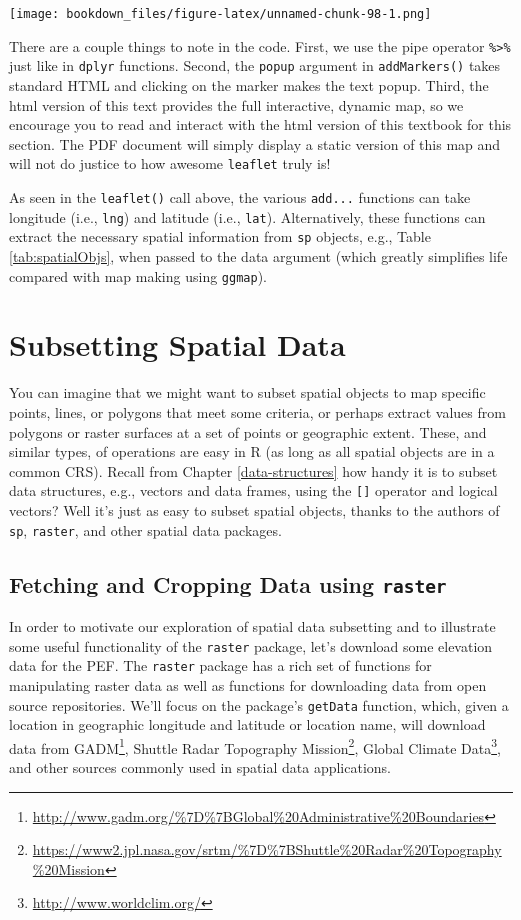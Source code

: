 \documentclass[]{krantz}
\renewcommand{\href}[2]{#2\footnote{\url{#1}}}
\theoremstyle{definition}
\theoremstyle{definition}
\theoremstyle{definition}
\theoremstyle{remark}
\begin{document}
\texttt{[image: bookdown\_files/figure-latex/unnamed-chunk-98-1.png]}

There are a couple things to note in the code. First, we use the pipe
operator \texttt{\%\textgreater{}\%} just like in \texttt{dplyr}
functions. Second, the \texttt{popup} argument in \texttt{addMarkers()}
takes standard HTML and clicking on the marker makes the text popup.
Third, the html version of this text provides the full interactive,
dynamic map, so we encourage you to read and interact with the html
version of this textbook for this section. The PDF document will simply
display a static version of this map and will not do justice to how
awesome \texttt{leaflet} truly is!

As seen in the \texttt{leaflet()} call above, the various
\texttt{add...} functions can take longitude (i.e., \texttt{lng}) and
latitude (i.e., \texttt{lat}). Alternatively, these functions can
extract the necessary spatial information from \texttt{sp} objects,
e.g., Table \ref{tab:spatialObjs}, when passed to the data argument
(which greatly simplifies life compared with map making using
\texttt{ggmap}).

\section{Subsetting Spatial Data}\label{subsetting-spatial-data}

You can imagine that we might want to subset spatial objects to map
specific points, lines, or polygons that meet some criteria, or perhaps
extract values from polygons or raster surfaces at a set of points or
geographic extent. These, and similar types, of operations are easy in R
(as long as all spatial objects are in a common CRS). Recall from
Chapter \ref{data-structures} how handy it is to subset data structures,
e.g., vectors and data frames, using the \texttt{{[}{]}} operator and
logical vectors? Well it's just as easy to subset spatial objects,
thanks to the authors of \texttt{sp}, \texttt{raster}, and other spatial
data packages.

\subsection{\texorpdfstring{Fetching and Cropping Data using
\texttt{raster}}{Fetching and Cropping Data using raster}}\label{fetching-and-cropping-data-using-raster}

In order to motivate our exploration of spatial data subsetting and to
illustrate some useful functionality of the \texttt{raster} package,
let's download some elevation data for the PEF. The \texttt{raster}
package has a rich set of functions for manipulating raster data as well
as functions for downloading data from open source repositories. We'll
focus on the package's \texttt{getData} function, which, given a
location in geographic longitude and latitude or location name, will
download data from
\href{http://www.gadm.org/\%7D\%7BGlobal\%20Administrative\%20Boundaries}{GADM},
\href{https://www2.jpl.nasa.gov/srtm/\%7D\%7BShuttle\%20Radar\%20Topography\%20Mission}{Shuttle
Radar Topography Mission}, \href{http://www.worldclim.org/}{Global
Climate Data}, and other sources commonly used in spatial data
applications.
\end{document}
